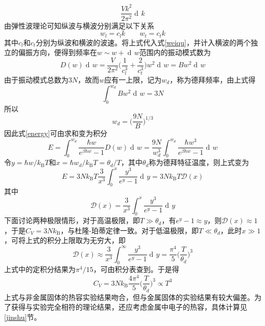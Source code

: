\documentclass[UTF8,oneside,openany]{ctexbook}
\DeclareMathOperator\dif{d\!}
\newcommand\kb{k_{\text{B}}}
\begin{document}
\begin{equation}\label{weiqu}
\frac{Vk^2}{2\pi^2}\dif k
\end{equation}
由弹性波理论可知纵波与横波分别满足以下关系
\begin{equation}
w_l=c_lk\qquad w_t=c_tk
\end{equation}
其中$c_l$和$c_t$分别为纵波和横波的波速。将上式代入式\ref{weiqu}，并计入横波的两个独立的偏振方向，便得到频率在$w\sim w+\dif w$范围内的振动模式数为
\begin{equation}
D(w)\dif w=\frac{V}{2\pi^2}\biggl(\frac{1}{c_l^3}+\frac{2}{c_t^3}\biggr)w^2\dif w=Bw^2\dif w
\end{equation}
由于振动模式总数为$3N$，故而$w$应有一上限，记为$w_d$，称为德拜频率，由上式得
\begin{equation}
\int_{0}^{w_d}Bw^2\dif w=3N
\end{equation}
所以
\begin{equation}
w_d=\biggl(\frac{9N}{B}\biggr)^{1/3}
\end{equation}
因此式\ref{energy}可由求和变为积分
\begin{equation}
E=\int_{0}^{w_d}\frac{\hbar w}{e^{\beta\hbar w}-1}D(w)\dif w=\frac{9N}{w_d^3}\int_{0}^{w_d}\frac{\hbar w^3}{e^{\beta\hbar w}-1}\dif w
\end{equation}
令$y=\hbar w/\kb T$和$x=\hbar w_d/\kb T=\theta_d/T$，其中$\theta_d$称为德拜特征温度，则上式变为
\begin{equation}
E=3N\kb T\frac{3}{x^3}\int_{0}^{x}\frac{y^3}{e^y-1}\dif y=3N\kb T\mathcal{D}(x)
\end{equation}
其中
\begin{equation}
\mathcal{D}(x)=\frac{3}{x^3}\int_{0}^{x}\frac{y^3}{e^y-1}\dif y
\end{equation}
下面讨论两种极限情形，对于高温极限，即$T\gg\theta_d$，有$e^y-1\approx y$，则$\mathcal{D}(x)\approx1$，于是$C_V=3N\kb$，与杜隆-珀蒂定律一致。对于低温极限，即$T\ll\theta_d$，此时$x\gg1$，可将上式的积分上限取为无穷大，即
\begin{equation}
\mathcal{D}(x)\approx\frac{3}{x^3}\int_{0}^{\infty}\frac{y^3}{e^y-1}\dif y=\frac{\pi^4}{5}\biggl(\frac{T}{\theta_d}\biggr)^3
\end{equation}
上式中的定积分结果为$\pi^4/15$，可由积分表查到。于是得
\begin{equation}
C_V=3N\kb\frac{4\pi^4}{5}\biggl(\frac{T}{\theta_d}\biggr)^3\propto T^3
\end{equation}
上式与非金属固体的热容实验结果吻合，但与金属固体的实验结果有较大偏差。为了获得与实验完全相符的理论结果，还应考虑金属中电子的热容，具体计算见\ref{jinshu}节。
\end{document}
